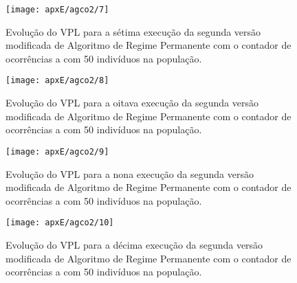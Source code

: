 \begin{figure}[H]
\centering
\texttt{[image: apxE/agco2/7]}
\caption{Evolução do VPL para a sétima execução da segunda versão modificada de Algoritmo de Regime Permanente com o contador de ocorrências a com 50 indivíduos na população.}
\label{fig:graphCO2-07}
\end{figure}

\begin{figure}[H]
\centering
\texttt{[image: apxE/agco2/8]}
\caption{Evolução do VPL para a oitava execução da segunda versão modificada de Algoritmo de Regime Permanente com o contador de ocorrências a com 50 indivíduos na população.}
\label{fig:graphCO2-08}
\end{figure}

\begin{figure}[H]
\centering
\texttt{[image: apxE/agco2/9]}
\caption{Evolução do VPL para a nona execução da segunda versão modificada de Algoritmo de Regime Permanente com o contador de ocorrências a com 50 indivíduos na população.}
\label{fig:graphCO2-09}
\end{figure}

\begin{figure}[H]
\centering
\texttt{[image: apxE/agco2/10]}
\caption{Evolução do VPL para a décima execução da segunda versão modificada de Algoritmo de Regime Permanente com o contador de ocorrências a com 50 indivíduos na população.}
\label{fig:graphCO2-10}
\end{figure}